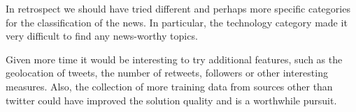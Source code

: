 \documentclass{llncs}
\begin{document}
In retrospect we should have tried different and perhaps more specific categories for the classification of the news. In particular, the technology category made it very difficult to find any news-worthy topics.

Given more time it would be interesting to try additional features, such as the geolocation of tweets, the number of retweets, followers or other interesting measures. Also, the collection of more training data from sources other than twitter could have improved the solution quality and is a worthwhile pursuit.



\end{document}
